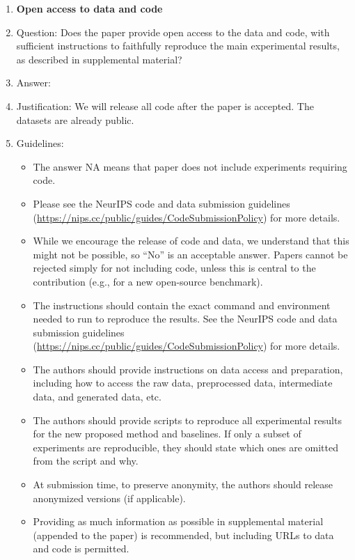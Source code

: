 \documentclass{article} %
\begin{document}
{\begin{appendices}
\begin{enumerate}
\item {\bf Open access to data and code}
    \item[] Question: Does the paper provide open access to the data and code, with sufficient instructions to faithfully reproduce the main experimental results, as described in supplemental material?
    \item[] Answer: \answerNo{}%
    \item[] Justification: We will release all code after the paper is accepted. The datasets are already public.
    \item[] Guidelines:
    \begin{itemize}
        \item The answer NA means that paper does not include experiments requiring code.
        \item Please see the NeurIPS code and data submission guidelines (\url{https://nips.cc/public/guides/CodeSubmissionPolicy}) for more details.
        \item While we encourage the release of code and data, we understand that this might not be possible, so “No” is an acceptable answer. Papers cannot be rejected simply for not including code, unless this is central to the contribution (e.g., for a new open-source benchmark).
        \item The instructions should contain the exact command and environment needed to run to reproduce the results. See the NeurIPS code and data submission guidelines (\url{https://nips.cc/public/guides/CodeSubmissionPolicy}) for more details.
        \item The authors should provide instructions on data access and preparation, including how to access the raw data, preprocessed data, intermediate data, and generated data, etc.
        \item The authors should provide scripts to reproduce all experimental results for the new proposed method and baselines. If only a subset of experiments are reproducible, they should state which ones are omitted from the script and why.
        \item At submission time, to preserve anonymity, the authors should release anonymized versions (if applicable).
        \item Providing as much information as possible in supplemental material (appended to the paper) is recommended, but including URLs to data and code is permitted.
    \end{itemize}



\end{enumerate}
\end{appendices}}
\end{document}
